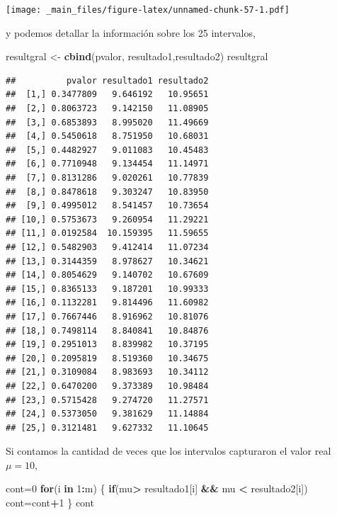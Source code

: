 \documentclass[
]{book}
\newenvironment{Shaded}{\begin{snugshade}}{\end{snugshade}}
\newcommand{\ControlFlowTok}[1]{\textcolor[rgb]{0.13,0.29,0.53}{\textbf{#1}}}
\newcommand{\DecValTok}[1]{\textcolor[rgb]{0.00,0.00,0.81}{#1}}
\newcommand{\FunctionTok}[1]{\textcolor[rgb]{0.13,0.29,0.53}{\textbf{#1}}}
\newcommand{\NormalTok}[1]{#1}
\newcommand{\OtherTok}[1]{\textcolor[rgb]{0.56,0.35,0.01}{#1}}
\newcommand{\SpecialCharTok}[1]{\textcolor[rgb]{0.81,0.36,0.00}{\textbf{#1}}}
\begin{document}
\texttt{[image: \_main\_files/figure-latex/unnamed-chunk-57-1.pdf]}

y podemos detallar la información sobre los 25 intervalos,

\begin{Shaded}
\begin{Highlighting}[]
\NormalTok{resultgral }\OtherTok{\textless{}{-}} \FunctionTok{cbind}\NormalTok{(pvalor, resultado1,resultado2)}
\NormalTok{resultgral}
\end{Highlighting}
\end{Shaded}

\begin{verbatim}
##          pvalor resultado1 resultado2
##  [1,] 0.3477809   9.646192   10.95651
##  [2,] 0.8063723   9.142150   11.08905
##  [3,] 0.6853893   8.995020   11.49669
##  [4,] 0.5450618   8.751950   10.68031
##  [5,] 0.4482927   9.011083   10.45483
##  [6,] 0.7710948   9.134454   11.14971
##  [7,] 0.8131286   9.020261   10.77839
##  [8,] 0.8478618   9.303247   10.83950
##  [9,] 0.4995012   8.541457   10.73654
## [10,] 0.5753673   9.260954   11.29221
## [11,] 0.0192584  10.159395   11.59655
## [12,] 0.5482903   9.412414   11.07234
## [13,] 0.3144359   8.978627   10.34621
## [14,] 0.8054629   9.140702   10.67609
## [15,] 0.8365133   9.187201   10.99333
## [16,] 0.1132281   9.814496   11.60982
## [17,] 0.7667446   8.916962   10.81076
## [18,] 0.7498114   8.840841   10.84876
## [19,] 0.2951013   8.839982   10.37195
## [20,] 0.2095819   8.519360   10.34675
## [21,] 0.3109084   8.983693   10.34112
## [22,] 0.6470200   9.373389   10.98484
## [23,] 0.5715428   9.274720   11.27571
## [24,] 0.5373050   9.381629   11.14884
## [25,] 0.3121481   9.627332   11.10645
\end{verbatim}

Si contamos la cantidad de veces que los intervalos capturaron el valor real \(\mu=10\),

\begin{Shaded}
\begin{Highlighting}[]
\NormalTok{cont}\OtherTok{=}\DecValTok{0}
\ControlFlowTok{for}\NormalTok{(i }\ControlFlowTok{in} \DecValTok{1}\SpecialCharTok{:}\NormalTok{m)}
\NormalTok{\{}
  \ControlFlowTok{if}\NormalTok{(mu}\SpecialCharTok{\textgreater{}}\NormalTok{ resultado1[i] }\SpecialCharTok{\&\&}\NormalTok{ mu }\SpecialCharTok{\textless{}}\NormalTok{ resultado2[i])}
\NormalTok{    cont}\OtherTok{=}\NormalTok{cont}\SpecialCharTok{+}\DecValTok{1}
\NormalTok{\}}
\NormalTok{cont}
\end{Highlighting}
\end{Shaded}
\end{document}
